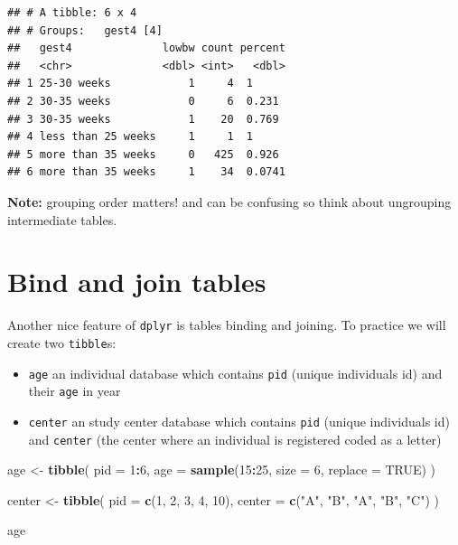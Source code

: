 \documentclass[
]{book}
\newenvironment{Shaded}{\begin{snugshade}}{\end{snugshade}}
\newcommand{\AttributeTok}[1]{\textcolor[rgb]{0.13,0.29,0.53}{#1}}
\newcommand{\ConstantTok}[1]{\textcolor[rgb]{0.56,0.35,0.01}{#1}}
\newcommand{\DecValTok}[1]{\textcolor[rgb]{0.00,0.00,0.81}{#1}}
\newcommand{\FunctionTok}[1]{\textcolor[rgb]{0.13,0.29,0.53}{\textbf{#1}}}
\newcommand{\NormalTok}[1]{#1}
\newcommand{\OtherTok}[1]{\textcolor[rgb]{0.56,0.35,0.01}{#1}}
\newcommand{\SpecialCharTok}[1]{\textcolor[rgb]{0.81,0.36,0.00}{\textbf{#1}}}
\newcommand{\StringTok}[1]{\textcolor[rgb]{0.31,0.60,0.02}{#1}}
\providecommand{\tightlist}{%
  \setlength{\itemsep}{0pt}\setlength{\parskip}{0pt}}
\theoremstyle{definition}
\theoremstyle{definition}
\theoremstyle{definition}
\theoremstyle{definition}
\theoremstyle{remark}
\begin{document}
\begin{verbatim}
## # A tibble: 6 x 4
## # Groups:   gest4 [4]
##   gest4              lowbw count percent
##   <chr>              <dbl> <int>   <dbl>
## 1 25-30 weeks            1     4  1     
## 2 30-35 weeks            0     6  0.231 
## 3 30-35 weeks            1    20  0.769 
## 4 less than 25 weeks     1     1  1     
## 5 more than 35 weeks     0   425  0.926 
## 6 more than 35 weeks     1    34  0.0741
\end{verbatim}

\textbf{Note:} grouping order matters! and can be confusing so think about ungrouping intermediate tables.

\section{Bind and join tables}\label{bind-and-join-tables}

Another nice feature of \texttt{dplyr} is tables binding and joining. To practice we will create two \texttt{tibble}s:

\begin{itemize}
\tightlist
\item
  \texttt{age} an individual database which contains \texttt{pid} (unique individuals id)
  and their \texttt{age} in year
\item
  \texttt{center} an study center database which contains \texttt{pid} (unique individuals id)
  and \texttt{center} (the center where an individual is registered coded as a letter)
\end{itemize}

\begin{Shaded}
\begin{Highlighting}[]
\NormalTok{age }\OtherTok{\textless{}{-}}
  \FunctionTok{tibble}\NormalTok{(}
    \AttributeTok{pid =} \DecValTok{1}\SpecialCharTok{:}\DecValTok{6}\NormalTok{,}
    \AttributeTok{age =} \FunctionTok{sample}\NormalTok{(}\DecValTok{15}\SpecialCharTok{:}\DecValTok{25}\NormalTok{, }\AttributeTok{size =} \DecValTok{6}\NormalTok{, }\AttributeTok{replace =} \ConstantTok{TRUE}\NormalTok{)}
\NormalTok{  )}

\NormalTok{center }\OtherTok{\textless{}{-}}
  \FunctionTok{tibble}\NormalTok{(}
    \AttributeTok{pid =} \FunctionTok{c}\NormalTok{(}\DecValTok{1}\NormalTok{, }\DecValTok{2}\NormalTok{, }\DecValTok{3}\NormalTok{, }\DecValTok{4}\NormalTok{, }\DecValTok{10}\NormalTok{),}
    \AttributeTok{center =} \FunctionTok{c}\NormalTok{(}\StringTok{"A"}\NormalTok{, }\StringTok{"B"}\NormalTok{, }\StringTok{"A"}\NormalTok{, }\StringTok{"B"}\NormalTok{, }\StringTok{"C"}\NormalTok{)}
\NormalTok{  )}

\NormalTok{age}
\end{Highlighting}
\end{Shaded}
\end{document}
